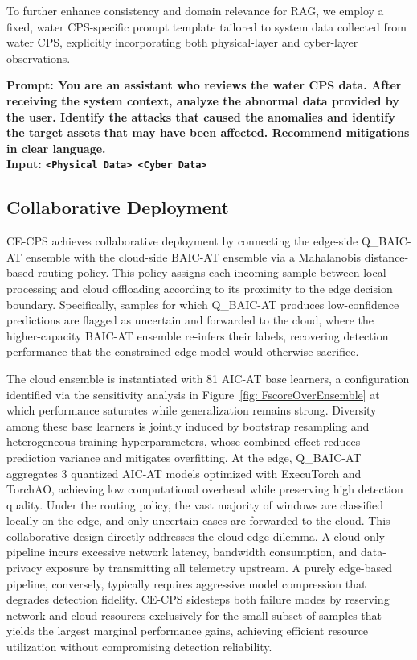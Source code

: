 \documentclass[pdflatex,sn-mathphys-num]{sn-jnl}%
\theoremstyle{thmstyleone}
\theoremstyle{thmstyletwo}%
\theoremstyle{thmstylethree}%
\begin{document}
To further enhance consistency and domain relevance for RAG, we employ a fixed, water CPS-specific prompt template tailored to system data collected from water CPS, explicitly incorporating both physical-layer and cyber-layer observations.
\begin{mdframed}[
  backgroundcolor=gray!3,
  linecolor=black!15,
  roundcorner=4pt,
  innertopmargin=6pt,
  innerbottommargin=6pt,
  leftmargin=0pt,
  rightmargin=0pt,
  skipabove=5pt,
  skipbelow=5pt
]
\noindent\textbf{Prompt: You are an assistant who reviews the water CPS data. After receiving the system context, analyze the abnormal data provided by the user. Identify the attacks that caused the anomalies and identify the target assets that may have been affected. Recommend mitigations in clear language. \\
\noindent\textbf{Input:} \texttt{<Physical Data> <Cyber Data>}
}
\end{mdframed}


\subsection{Collaborative Deployment} \label{method: deployment} 
CE-CPS achieves collaborative deployment by connecting the edge-side Q\_BAIC-AT ensemble with the cloud-side BAIC-AT ensemble via a Mahalanobis distance-based routing policy. This policy assigns each incoming sample between local processing and cloud offloading according to its proximity to the edge decision boundary.
Specifically, samples for which Q\_BAIC-AT produces low-confidence predictions are flagged as uncertain and forwarded to the cloud, where the higher-capacity BAIC-AT ensemble re-infers their labels, recovering detection performance that the constrained edge model would otherwise sacrifice.

The cloud ensemble is instantiated with 81 AIC-AT base learners, a configuration identified via the sensitivity analysis in Figure~\ref{fig: FscoreOverEnsemble} at which performance saturates while generalization remains strong. Diversity among these base learners is jointly induced by bootstrap resampling and heterogeneous training hyperparameters, whose combined effect reduces prediction variance and mitigates overfitting. At the edge, Q\_BAIC-AT aggregates 3 quantized AIC-AT models optimized with ExecuTorch and TorchAO, achieving low computational overhead while preserving high detection quality.
Under the routing policy, the vast majority of windows are classified locally on the edge, and only uncertain cases are forwarded to the cloud.
This collaborative design directly addresses the cloud-edge dilemma. A cloud-only pipeline incurs excessive network latency, bandwidth consumption, and data-privacy exposure by transmitting all telemetry upstream. A purely edge-based pipeline, conversely, typically requires aggressive model compression that degrades detection fidelity.
CE-CPS sidesteps both failure modes by reserving network and cloud resources exclusively for the small subset of samples that yields the largest marginal performance gains, achieving efficient resource utilization without compromising detection reliability.
\end{document}
